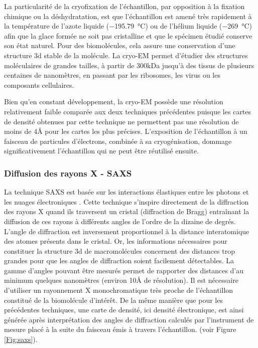 La particularité de la cryofixation de l'échantillon, par opposition à la fixation chimique ou la déshydratation, est que l'échantillon est amené très rapidement à la température de l'azote liquide (\SI{-195.79}{\degreeCelsius}) ou de l'hélium liquide (\SI{-269}{\degreeCelsius}) afin que la glace formée ne soit pas cristalline et que le spécimen étudié conserve son état naturel. Pour des biomolécules, cela assure une conservation d'une structure 3d stable de la molécule. La cryo-EM permet d'étudier des structures moléculaires de grandes tailles, à partir de 300kDa jusqu'à des tissus de plusieurs centaines de nanomètres, en passant par les ribosomes, les virus ou les composants cellulaires.

Bien qu'en constant développement, la cryo-EM possède une résolution relativement faible comparée aux deux techniques précédentes puisque les cartes de densité obtenues par cette technique ne permettent pas une résolution de moins de 4\r{A} pour les cartes les plus précises\cite{zhou_atomic_2011}. L'exposition de l'échantillon à un faisceau de particules d'électrons, combinée à sa cryogénisation, dommage significativement l'échantillon qui ne peut être réutilisé ensuite.



\subsubsection{Diffusion des rayons X - SAXS}

La technique SAXS est basée sur les interactions élastiques entre les photons et les nuages électroniques \cite{guimer1955small}. Cette technique s'inspire directement de la diffraction des rayons X quand ils traversent un cristal (diffraction de Bragg) entraînant la diffusion de ces rayons à différents angles de l'ordre de la dizaine de degrés. L'angle de diffraction est inversement proportionnel à la distance interatomique des atomes présents dans le cristal. Or, les informations nécessaires pour constituer la structure 3d de macromolécules concernent des distances trop grandes pour que les angles de diffraction soient facilement détectables. La gamme d'angles pouvant être mesurés permet de rapporter des distances d'au minimum quelques nanomètres (environ 10\r{A} de résolution). Il est nécessaire d'utiliser un rayonnement X monochromatique très proche de l'échantillon constitué de la biomolécule d'intérêt. De la même manière que pour les précédentes techniques, une carte de densité, ici densité électronique, est ainsi générée après interprétation des angles de diffraction calculés par l'instrument de mesure placé à la suite du faisceau émis à travers l'échantillon. (voir Figure \ref{Fig:saxs}).

